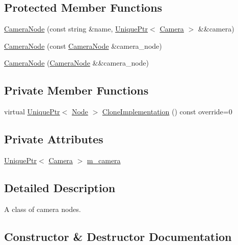 \subsection*{Protected Member Functions}
\begin{DoxyCompactItemize}
\item 
\hyperlink{classmage_1_1_camera_node_a943cecfc5f96ad22f0f64d0f7b3f3640}{Camera\+Node} (const string \&name, \hyperlink{namespacemage_a3316d7143a973e37adf1110f2e80ca31}{Unique\+Ptr}$<$ \hyperlink{classmage_1_1_camera}{Camera} $>$ \&\&camera)
\item 
\hyperlink{classmage_1_1_camera_node_aa0becc29c416c313ebda763edb1b2181}{Camera\+Node} (const \hyperlink{classmage_1_1_camera_node}{Camera\+Node} \&camera\+\_\+node)
\item 
\hyperlink{classmage_1_1_camera_node_af46b911ecf12ed7c3cb31fb98a590fc1}{Camera\+Node} (\hyperlink{classmage_1_1_camera_node}{Camera\+Node} \&\&camera\+\_\+node)
\end{DoxyCompactItemize}
\subsection*{Private Member Functions}
\begin{DoxyCompactItemize}
\item 
virtual \hyperlink{namespacemage_a3316d7143a973e37adf1110f2e80ca31}{Unique\+Ptr}$<$ \hyperlink{classmage_1_1_node}{Node} $>$ \hyperlink{classmage_1_1_camera_node_a002d3a2b41cda270a26ca5d8f3a17f55}{Clone\+Implementation} () const override=0
\end{DoxyCompactItemize}
\subsection*{Private Attributes}
\begin{DoxyCompactItemize}
\item 
\hyperlink{namespacemage_a3316d7143a973e37adf1110f2e80ca31}{Unique\+Ptr}$<$ \hyperlink{classmage_1_1_camera}{Camera} $>$ \hyperlink{classmage_1_1_camera_node_a18f00f7ccd0c677043e11a1b3085dbfb}{m\+\_\+camera}
\end{DoxyCompactItemize}


\subsection{Detailed Description}
A class of camera nodes. 

\subsection{Constructor \& Destructor Documentation}
\hypertarget{classmage_1_1_camera_node_ac6612668e7b9f829e371794d422d357f}{}\label{classmage_1_1_camera_node_ac6612668e7b9f829e371794d422d357f} 
